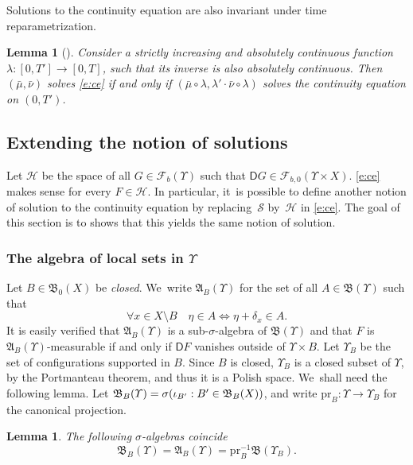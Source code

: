 \documentclass[JEP,XML,SOM,Unicode,published]{cedram}
\newtheorem{lemma}[theorem]{Lemma}
\theoremstyle{definition}
\theoremstyle{remark}
\DeclarePairedDelimiter{\paren}{\lparen}{\rparen}
\begin{document}
Solutions to the continuity equation are also invariant under time reparametrization.
\begin{lemma}[{\cite[Lem.\,8.1.3]{AGS}}]\label{t:ce-time-reparametrization}
Consider a strictly increasing and absolutely continuous function $\lambda \colon [0,T'] \to [0,T]$, such that its inverse is also absolutely continuous.
Then $(\bar{\mu}, \bar{\nu})$ solves \cref{e:ce} if and only if $(\bar{\mu} \circ \lambda, \lambda' \cdot \bar{\nu} \circ \lambda)$ solves the continuity equation on $(0,T')$.
\end{lemma}

\subsection{Extending the notion of solutions}
Let $\mathscr{H}$ be the space of all $G \in \mathscr{F}_{b}(\varUpsilon)$ such that $\mathsf{D} G \in \mathscr{F}_{b,0}(\varUpsilon \times X)$.
\cref{e:ce} makes sense for every $F \in \mathscr{H}$.
In particular, it~is possible to define another notion of solution to the continuity equation by replacing~$\mathscr{S}$ by~$\mathscr{H}$ in \cref{e:ce}.
The goal of this section is to shows that this yields the same notion of solution.

\subsubsection{The algebra of local sets \texorpdfstring{in $\varUpsilon$}{on the space of configurations}}\label{s:local-algebra}
Let $B \in \mathfrak{B}_{0}(X)$ be \emph{closed}. We~write $\mathfrak{A}_{B}(\varUpsilon)$ for the set of all $A \in \mathfrak{B}(\varUpsilon)$ such that
\begin{equation*}
\forall x \in X \setminus B \quad \eta \in A \iff \eta + \delta_{x} \in A .
\end{equation*}
It is easily verified that $\mathfrak{A}_{B}(\varUpsilon)$ is a sub-$\sigma$-algebra of $\mathfrak{B}(\varUpsilon)$ and that $F$ is $\mathfrak{A}_{B}(\varUpsilon)$-measurable if and only if $\mathsf{D} F$ vanishes outside of $\varUpsilon \times B$.
Let $\varUpsilon_{B}$ be the set of configurations supported in $B$.
Since $B$ is closed, $\varUpsilon_{B}$ is a closed subset of $\varUpsilon$, by the Portmanteau theorem, and thus it is a Polish space. We~shall need the following lemma.
Let $\mathfrak{B}_{B}(\varUpsilon) = \sigma\paren*{\iota_{B'} : B' \in \mathfrak{B}_{B}(X)} $, and write $\mathrm{pr}_{B} \colon \varUpsilon \to \varUpsilon_{B}$ for the canonical projection.
\begin{lemma}\label{t:local-sigma-algebra}
The following $\sigma$-algebras coincide
\begin{equation*}
\mathfrak{B}_{B}(\varUpsilon) = \mathfrak{A}_{B}(\varUpsilon) = \mathrm{pr}_{B}^{-1} \mathfrak{B}(\varUpsilon_{B}).
\end{equation*}
\end{lemma}
\end{document}
